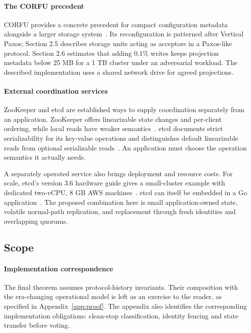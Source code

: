 \documentclass[10pt,journal,letterpaper]{IEEEtran}
\begin{document}
\paragraph{The CORFU precedent}
CORFU provides a concrete precedent for compact configuration metadata alongside a larger storage system~\cite{corfu}. Its reconfiguration is patterned after Vertical Paxos; Section 2.5 describes storage units acting as acceptors in a Paxos-like protocol. Section 2.6 estimates that adding 0.1\% writes keeps projection metadata below 25 MB for a 1 TB cluster under an adversarial workload. The described implementation uses a shared network drive for agreed projections.

\paragraph{External coordination services}
ZooKeeper and etcd are established ways to supply coordination separately from an application. ZooKeeper offers linearizable state changes and per-client ordering, while local reads have weaker semantics~\cite{zookeeper}. etcd documents strict serializability for its key-value operations and distinguishes default linearizable reads from optional serializable reads~\cite{etcd-guarantees}. An application must choose the operation semantics it actually needs.

A separately operated service also brings deployment and resource costs. For scale, etcd's version 3.6 hardware guide gives a small-cluster example with dedicated two-vCPU, 8 GB AWS machines~\cite{etcd-hardware}. etcd can itself be embedded in a Go application~\cite{etcd-embed}. The proposed combination here is small application-owned state, volatile normal-path replication, and replacement through fresh identities and overlapping quorums.

\subsection{Scope}
\paragraph{Implementation correspondence}
The final theorem assumes protocol-history invariants. Their composition with the era-changing operational model is left as an exercise to the reader, as specified in Appendix~\ref{app:proof}. The appendix also identifies the corresponding implementation obligations: clean-stop classification, identity fencing and state transfer before voting.
\end{document}
